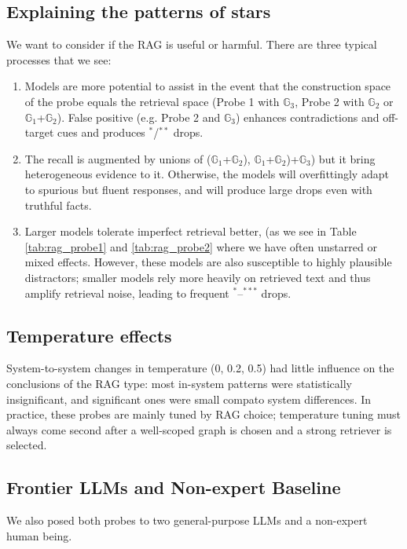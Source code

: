 \subsection{Explaining the patterns of stars}
We want to consider if the RAG is useful or harmful. There are three typical processes that we see:
\begin{enumerate}
  \item  Models are more potential to assist in the event that the construction space of the probe equals the retrieval space (Probe 1 with $\mathbb{G}_3$, Probe 2 with $\mathbb{G}_2$ or $\mathbb{G}_1$+$\mathbb{G}_2$). False positive (e.g. Probe 2 and $\mathbb{G}_3$) enhances contradictions and off-target cues and produces $^{*}$/$^{**}$ drops.
  \item  The recall is augmented by unions of ($\mathbb{G}_1$+$\mathbb{G}_2$), $\mathbb{G}_1$+$\mathbb{G}_2$)+$\mathbb{G}_3$) but it bring heterogeneous evidence to it. Otherwise, the models will overfittingly adapt to spurious but fluent responses, and will produce large drops even with truthful facts.
  \item Larger models tolerate imperfect retrieval better, (as we see in Table \ref{tab:rag_probe1} and \ref{tab:rag_probe2} where we have often unstarred or mixed effects. However, these models are also susceptible to {highly plausible} distractors; smaller models rely more heavily on retrieved text and thus amplify retrieval noise, leading to frequent $^{*}$–$^{***}$ drops.
\end{enumerate}

\subsection{Temperature effects}
System-to-system changes in temperature (0, 0.2, 0.5) had little influence on the conclusions of the RAG type: most in-system patterns were statistically insignificant, and significant ones were small compato system differences. In practice, these probes are mainly tuned by RAG choice; temperature tuning must always come second after a well-scoped graph is chosen and a strong retriever is selected.

\subsection{Frontier LLMs and Non-expert Baseline}
\label{subsec:frontier_llm_baseline}

We also posed both probes to two general-purpose LLMs and a non-expert human being. 

